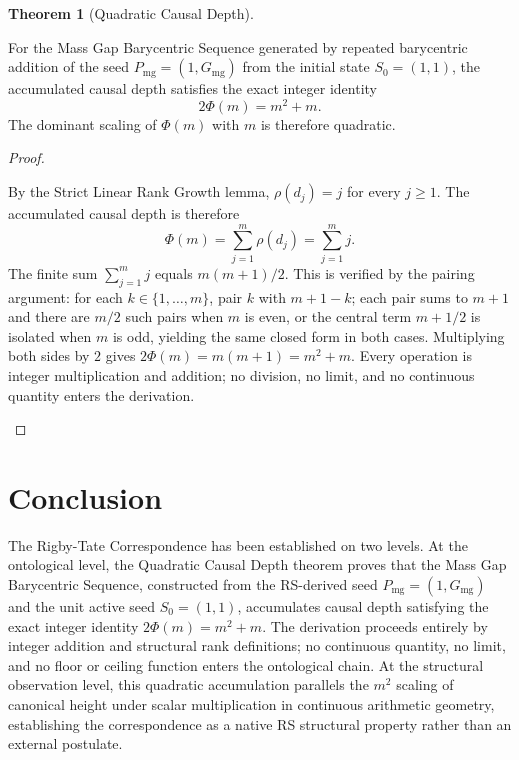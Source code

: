 \documentclass[11pt, letterpaper]{article}
\newcommand{\rank}{\rho}
\newcommand{\Gmg}{G_{\mathrm{mg}}}
\theoremstyle{definition}
\newtheorem{theorem}{Theorem}[section]
\begin{document}
\begin{theorem}[Quadratic Causal Depth]
\begin{rsbox}
For the Mass Gap Barycentric Sequence generated by repeated barycentric addition of the seed $P_{\mathrm{mg}} = (1, \Gmg)$ from the initial state $S_0 = (1, 1)$, the accumulated causal depth satisfies the exact integer identity
\[
2\Phi(m) = m^2 + m.
\]
The dominant scaling of $\Phi(m)$ with $m$ is therefore quadratic.
\end{rsbox}
\begin{proof}
\begin{rsbox}
By the Strict Linear Rank Growth lemma, $\rank(d_j) = j$ for every $j \ge 1$. The accumulated causal depth is therefore
\[
\Phi(m) = \sum_{j=1}^{m} \rank(d_j) = \sum_{j=1}^{m} j.
\]
The finite sum $\sum_{j=1}^{m} j$ equals $m(m+1)/2$. This is verified by the pairing argument: for each $k \in \{1, \ldots, m\}$, pair $k$ with $m+1-k$; each pair sums to $m+1$ and there are $m/2$ such pairs when $m$ is even, or the central term $m+1/2$ is isolated when $m$ is odd, yielding the same closed form in both cases. Multiplying both sides by $2$ gives $2\Phi(m) = m(m+1) = m^2 + m$. Every operation is integer multiplication and addition; no division, no limit, and no continuous quantity enters the derivation.
\end{rsbox}
\end{proof}
\end{theorem}

\section{Conclusion}

The Rigby-Tate Correspondence has been established on two levels. At the ontological level, the Quadratic Causal Depth theorem proves that the Mass Gap Barycentric Sequence, constructed from the RS-derived seed $P_{\mathrm{mg}} = (1, \Gmg)$ and the unit active seed $S_0 = (1,1)$, accumulates causal depth satisfying the exact integer identity $2\Phi(m) = m^2 + m$. The derivation proceeds entirely by integer addition and structural rank definitions; no continuous quantity, no limit, and no floor or ceiling function enters the ontological chain. At the structural observation level, this quadratic accumulation parallels the $m^2$ scaling of canonical height under scalar multiplication in continuous arithmetic geometry, establishing the correspondence as a native RS structural property rather than an external postulate.
\end{document}
